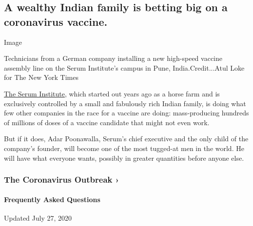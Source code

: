 \hypertarget{a-wealthy-indian-family-is-betting-big-on-a-coronavirus-vaccine}{%
\subsection{A wealthy Indian family is betting big on a coronavirus
vaccine.}\label{a-wealthy-indian-family-is-betting-big-on-a-coronavirus-vaccine}}

Image

Technicians from a German company installing a new high-speed vaccine
assembly line on the Serum Institute's campus in Pune,
India.Credit...Atul Loke for The New York Times

\href{https://www.seruminstitute.com/index.php}{The Serum Institute},
which started out years ago as a horse farm and is exclusively
controlled by a small and fabulously rich Indian family, is doing what
few other companies in the race for a vaccine are doing: mass-producing
hundreds of millions of doses of a vaccine candidate that might not even
work.

But if it does, Adar Poonawalla, Serum's chief executive and the only
child of the company's founder, will become one of the most tugged-at
men in the world. He will have what everyone wants, possibly in greater
quantities before anyone else.

\href{https://www.nytimes3xbfgragh.onion/news-event/coronavirus?action=click\&pgtype=Article\&state=default\&region=MAIN_CONTENT_3\&context=storylines_faq}{}

\hypertarget{the-coronavirus-outbreak-}{%
\subsubsection{The Coronavirus Outbreak
›}\label{the-coronavirus-outbreak-}}

\hypertarget{frequently-asked-questions}{%
\paragraph{Frequently Asked
Questions}\label{frequently-asked-questions}}

Updated July 27, 2020

